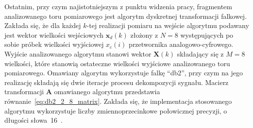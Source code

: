 Ostatnim, przy czym najistotniejszym z punktu widzenia pracy, fragmentem analizowanego toru pomiarowego jest algorytm dyskretnej transformacji falkowej. Zakłada się, że dla każdej $k$-tej realizacji pomiaru na wejście algorytmu podawany jest wektor wielkości wejściowych $\mathbf{x}_{d}(k)$ złożony z $N = 8$ występujących po sobie próbek wielkości wyjściowej $x_{c}(i)$ przetwornika analogowo-cyfrowego. Wyjście analizowanego algorytmu stanowi wektor $\mathbf{X}(k)$ składający się z $M = 8$ wielkości, które stanowią ostateczne wielkości wyjściowe analizowanego toru pomiarowego. Omawiany algorytm wykorzystuje falkę \enquote{db2}, przy czym na jego realizację składają się dwie iteracje procesu dekompozycji sygnału. Macierz transformacji $\mathbf{A}$ omawianego algorytmu przedstawia równanie~\eqref{eq:db2_2_8_matrix}. Zakłada się, że implementacja stosowanego algorytmu wykorzystuje liczby zmiennoprzecinkowe połowicznej precyzji, o długości słowa~\qty{16}{\bitOw}~\cite{gcc_manual}.


